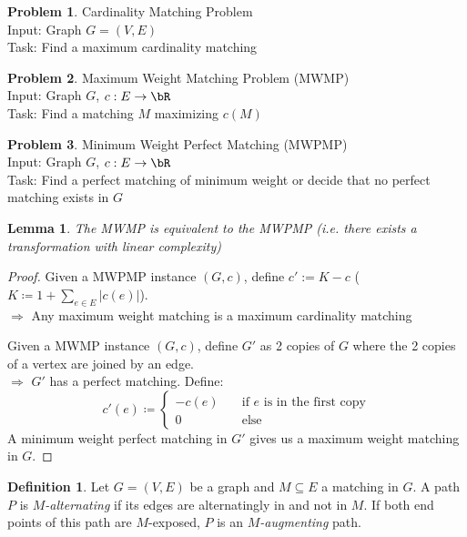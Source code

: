 \documentclass[11pt, a4paper]{article}
\newcommand{\abs}[1]{\left\lvert#1\right\rvert}
\newtheorem{lemma}[theorem]{Lemma}
\theoremstyle{remark}
\theoremstyle{definition}
\newtheorem{definition}[theorem]{Definition}
\newtheorem*{problem}{Problem}
\begin{document}
\begin{problem}{Cardinality Matching Problem}\\
Input: Graph $G=(V,E)$ \\
Task: Find a maximum cardinality matching
\end{problem}

\begin{problem}{Maximum Weight Matching Problem (MWMP)}\\
Input: Graph $G$, $c:E\to \bR$ \\
Task: Find a matching $M$ maximizing $c(M)$
\end{problem}

\begin{problem}{Minimum Weight Perfect Matching (MWPMP)}\\
Input: Graph $G$, $c:E\to\bR$\\
Task: Find a perfect matching of minimum weight or decide that no
perfect matching exists in $G$
\end{problem}

\begin{lemma}
	The MWMP is equivalent to the MWPMP (i.e. there exists a transformation
	with linear complexity)
\end{lemma}
\begin{proof}
	Given a MWPMP instance $(G,c)$, define $c':=K-c$
	($K\coloneqq 1+\sum_{e\in E}\abs{c(e)}$). \\
	$\Rightarrow$ Any maximum weight matching is a maximum cardinality
	matching

	Given a MWMP instance $(G,c)$, define $G'$ as 2 copies of $G$ where
	the 2 copies of a vertex are joined by an edge. \\ $\Rightarrow$ $G'$
	has a perfect matching. Define:
	\[c'(e)\coloneqq \begin{cases}
			-c(e) \quad & \text{if $e$ is in the first copy} \\
			0           & \text{else}
		\end{cases}\]
	A minimum weight perfect matching in $G'$ gives us a maximum weight
	matching in $G$.
\end{proof}

\begin{definition}
	Let $G=(V,E)$ be a graph and $M\subseteq E$ a matching in $G$.
	A path $P$ is \emph{$M$-alternating} if its edges are alternatingly
	in and not in $M$. If both end points of this path are $M$-exposed,
	$P$ is an \emph{$M$-augmenting} path.
\end{definition}
\end{document}
